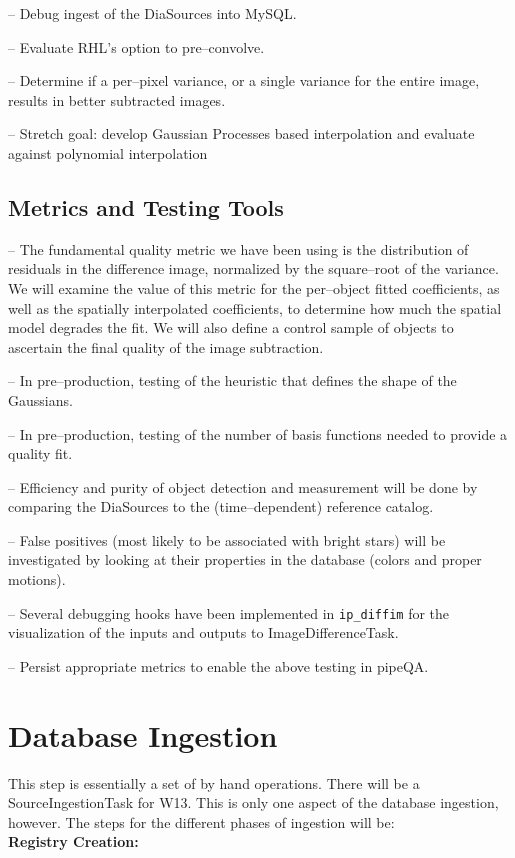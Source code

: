 \documentclass[prd, nofootinbib, floatfix, 11pt,tightenlines,times]{article}
\begin{document}
-- Debug ingest of the DiaSources into MySQL.

-- Evaluate RHL's option to pre--convolve.

-- Determine if a per--pixel variance, or a single variance for the entire
image, results in better subtracted images.

-- Stretch goal: develop Gaussian Processes based interpolation and
evaluate against polynomial interpolation

\subsection{Metrics and Testing Tools}

-- The fundamental quality metric we have been using is the
distribution of residuals in the difference image, normalized by the
square--root of the variance.  We will examine the value of this
metric for the per--object fitted coefficients, as well as the
spatially interpolated coefficients, to determine how much the spatial
model degrades the fit.  We will also define a control sample of
objects to ascertain the final quality of the image subtraction.

-- In pre--production, testing of the heuristic that defines the shape
of the Gaussians.

-- In pre--production, testing of the number of basis functions needed
to provide a quality fit.  

-- Efficiency and purity of object detection and measurement will be
done by comparing the DiaSources to the (time--dependent) reference
catalog.

-- False positives (most likely to be associated with bright stars)
will be investigated by looking at their properties in the database
(colors and proper motions).

-- Several debugging hooks have been implemented in {\tt ip\_diffim} for
the visualization of the inputs and outputs to ImageDifferenceTask.

-- Persist appropriate metrics to enable the above testing in pipeQA.


\section{Database Ingestion} 
This step is essentially a set of by hand operations.  
There will be a SourceIngestionTask for W13.  This is only one aspect of the
database ingestion, however.  The steps for the different phases of ingestion will be:\\
{\bf Registry Creation:}
\end{document}
